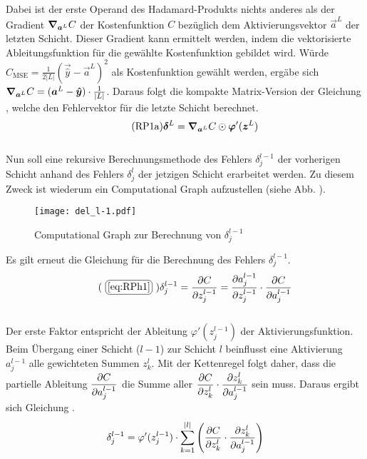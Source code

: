 \begin{appendices}
Dabei ist der erste Operand des Hadamard-Produkts nichts anderes als
der Gradient $\bm{\nabla}_{\bm{a}^L} C$ der Kostenfunktion $C$ bezüglich dem Aktivierungsvektor
$\vec{a}^L$ der letzten Schicht. Dieser Gradient kann ermittelt werden, indem die
vektorisierte Ableitungsfunktion für die gewählte Kostenfunktion gebildet wird.
Würde $C_{\text{MSE}} = \frac{1}{2|L|}(\vec{\hat{y}} -
\vec{a}^L)^2$ als Kostenfunktion gewählt werden,
ergäbe sich $\bm{\nabla}_{\bm{a}^L} C = (\bm{a}^L - \bm{\hat{y}}) \cdot \frac{1}{|L|}$.
\para{}
Daraus folgt die kompakte Matrix-Version  der Gleichung
, welche den Fehlervektor für die letzte Schicht berechnet.
\\
\begin{equation}\tag{RP1a}\label{eq:RP1a}
  \bm{\delta}^L = \bm{\nabla}_{\bm{a}^L}C \odot \bm{\varphi}'(\bm{z}^L)
\end{equation}
\\
Nun soll eine rekursive Berechnungsmethode des Fehlers $\delta_j^{l-1}$
der vorherigen Schicht anhand des Fehlers $\delta_j^l$ der jetzigen Schicht
erarbeitet werden. Zu diesem Zweck ist wiederum ein Computational Graph aufzustellen
(siehe Abb. ).
\para{}
\begin{figure}[h!]
  \centering
  \texttt{[image: del\_l-1.pdf]}
  \caption{Computational Graph zur Berechnung von $\delta_j^{l-1}$}
  \label{fig:cg_L-1}
\end{figure}
\para{}
Es gilt erneut die Gleichung  für die Berechnung des Fehlers $\delta_j^{l-1}$.
\\
\begin{equation}\tag{\refbox{eq:RPh1}}
  \delta_j^{l-1} = \partderiv{C}{z_j^{l-1}} = \partderiv{a_j^{l-1}}{z_j^{l-1}} \cdot \partderiv{C}{a_j^{l-1}}
\end{equation}
\\
Der erste Faktor entspricht der Ableitung $\varphi'(z_j^{l-1})$ der Aktivierungsfunktion.
Beim Übergang einer Schicht ($l-1$) zur Schicht $l$ beinflusst eine Aktivierung
$a_j^{l-1}$ alle gewichteten Summen $z_k^l$. Mit der Kettenregel folgt daher,
dass die partielle Ableitung $\displaystyle\frac{\partial C}{\partial a_j^{l-1}}$ die Summe aller
$\displaystyle\frac{\partial C}{\partial z_k^l} \cdot \displaystyle\frac{\partial z_k^l}{\partial a_j^{l-1}}$ sein muss.
Daraus ergibt sich Gleichung .
\\
\begin{equation}\label{eq:RPh2}
  \delta_j^{l-1} = \varphi'(z_j^{l-1}) \cdot \sum_{k=1}^{|l|} \left( \partderiv{C}{z_k^l} \cdot \partderiv{z_k^l}{a_j^{l-1}} \right)

\end{equation}
\end{appendices}
